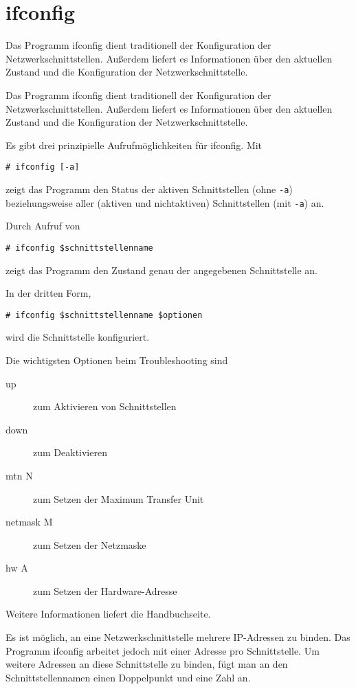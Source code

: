 \section{ifconfig}
\label{sec:netz-werkzeuge-ifconfig}
\begin{abstractsec}
  Das Programm ifconfig dient traditionell der Konfiguration der
  Netzwerkschnittstellen. Außerdem liefert es Informationen über den aktuellen
  Zustand und die Konfiguration der Netzwerkschnittstelle.
\end{abstractsec}
\begin{normaltext}
  Das Programm ifconfig dient traditionell der Konfiguration der
  Netzwerkschnittstellen. Außerdem liefert es Informationen über den aktuellen
  Zustand und die Konfiguration der Netzwerkschnittstelle.

  Es gibt drei prinzipielle Aufrufmöglichkeiten für ifconfig. Mit
  \begin{verbatim}
# ifconfig [-a]
  \end{verbatim}
  zeigt das Programm den Status der aktiven Schnittstellen (ohne \verb?-a?)
  beziehungsweise aller (aktiven und nichtaktiven) Schnittstellen (mit
  \verb?-a?) an.

  Durch Aufruf von
  \begin{verbatim}
# ifconfig $schnittstellenname
  \end{verbatim}
  zeigt das Programm den Zustand genau der angegebenen Schnittstelle an.

  In der dritten Form,
  \begin{verbatim}
# ifconfig $schnittstellenname $optionen
  \end{verbatim}
  wird die Schnittstelle konfiguriert.

  Die wichtigsten Optionen beim Troubleshooting sind
  \begin{description}
    \item[up] zum Aktivieren von Schnittstellen
    \item[down] zum Deaktivieren
    \item[mtn N] zum Setzen der Maximum Transfer Unit
    \item[netmask M] zum Setzen der Netzmaske
    \item[hw A] zum Setzen der Hardware-Adresse
  \end{description}

  Weitere Informationen liefert die Handbuchseite.

  Es ist möglich, an eine Netzwerkschnittstelle mehrere IP-Adressen zu binden.
  Das Programm ifconfig arbeitet jedoch mit einer Adresse pro Schnittstelle.
  Um weitere Adressen an diese Schnittstelle zu binden, fügt man an den
  Schnittstellennamen einen Doppelpunkt und eine Zahl an.


\end{normaltext}
